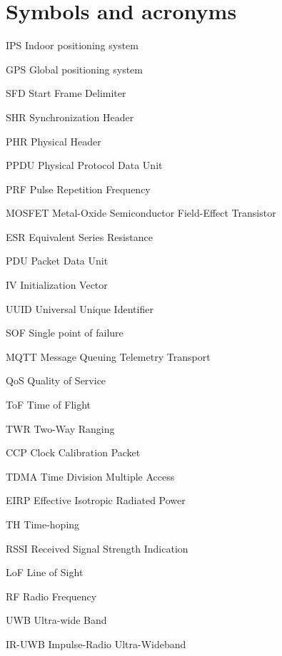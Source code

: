 \documentclass[\main/main.tex]{subfiles}
\begin{document}
\chapter*{Symbols and acronyms}
\begin{abbrv}
    \item[IPS]  Indoor positioning system
    \item[GPS]  Global positioning system 
    \item[SFD]  Start Frame Delimiter
    \item[SHR]  Synchronization Header
    \item[PHR]  Physical Header
    \item[PPDU] Physical Protocol Data Unit
    \item[PRF]  Pulse Repetition Frequency
    \item[MOSFET]  Metal-Oxide Semiconductor Field-Effect Transistor
    \item[ESR]  Equivalent Series Resistance
    \item[PDU] Packet Data Unit
    \item[IV] Initialization Vector
    \item[UUID] Universal Unique Identifier 
    \item[SOF] Single point of failure  
    \item[MQTT] Message Queuing Telemetry Transport 
    \item[QoS] Quality of Service
    \item[ToF] Time of Flight
    \item[TWR] Two-Way Ranging
    \item[CCP] Clock Calibration Packet  
    \item[TDMA] Time Division Multiple Access 
    \item[EIRP] Effective Isotropic Radiated Power
    \item[TH] Time-hoping 
    \item[RSSI] Received Signal Strength Indication
    \item[LoF] Line of Sight
    \item[RF] Radio Frequency 
    \item[UWB] Ultra-wide Band 
    \item[IR-UWB] Impulse-Radio Ultra-Wideband 
\end{abbrv}
\end{document}

